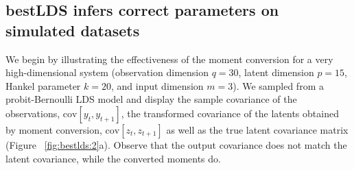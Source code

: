 \subsection{bestLDS infers correct parameters on simulated datasets}
\label{sec:bestlds:results:4.1}

We begin by illustrating the effectiveness of the moment conversion for a very high-dimensional system (observation dimension $q = 30$, latent dimension $p = 15$, Hankel parameter $k =20$, and input dimension $m=3$). We sampled from a probit-Bernoulli LDS model and display the sample covariance of the observations, $\mathrm{cov}[y_t, y_{t+1}]$, the transformed covariance of the latents obtained by moment conversion, $\mathrm{cov}[z_{t}, z_{t+1}]$ as well as the true latent covariance matrix (Figure ~\ref{fig:bestlds:2}a). Observe that the output covariance does not match the latent covariance, while the converted moments do.

